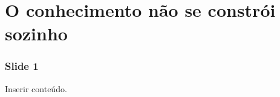 \section{O conhecimento não se constrói sozinho}

\begin{frame}
  \frametitle{Slide 1}
  Inserir conteúdo.
\end{frame}
